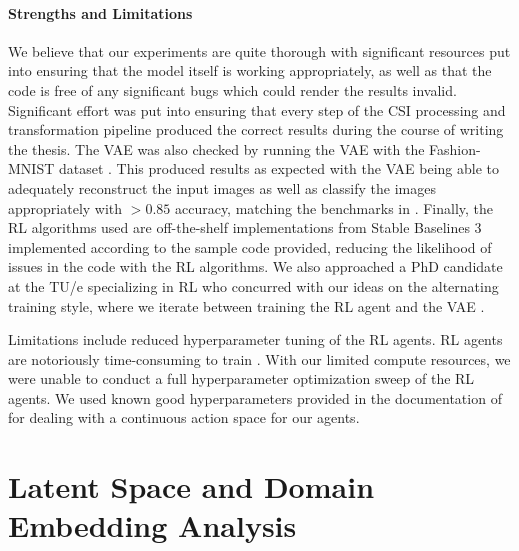 \paragraph{Strengths and Limitations}
We believe that our experiments are quite thorough with significant resources put into ensuring that the model itself is working appropriately, as well as that the code is free of any significant bugs which could render the results invalid.
Significant effort was put into ensuring that every step of the CSI processing and transformation pipeline produced the correct results during the course of writing the thesis.
The VAE was also checked by running the VAE with the Fashion-MNIST dataset \cite{xiao2017fashion}.
This produced results as expected with the VAE being able to adequately reconstruct the input images as well as classify the images appropriately with $>0.85$ accuracy, matching the benchmarks in \cite{xiao2017fashion}.
Finally, the RL algorithms used are off-the-shelf implementations from Stable Baselines 3 \cite{raffin2021stable} implemented according to the sample code provided, reducing the likelihood of issues in the code with the RL algorithms.
We also approached a PhD candidate at the TU/e specializing in RL who concurred with our ideas on the alternating training style, where we iterate between training the RL agent and the VAE \cite{grooten2023interview}.

Limitations include reduced hyperparameter tuning of the RL agents.
RL agents are notoriously time-consuming to train \cite{schulman2017proximal,schulman2017trust,lillicrap2015continuous}.
With our limited compute resources, we were unable to conduct a full hyperparameter optimization sweep of the RL agents.
We used known good hyperparameters provided in the documentation of \cite{raffin2021stable} for dealing with a continuous action space for our agents.

\section{Latent Space and Domain Embedding Analysis}\label{sec:discussion-ls-de-analysis}

